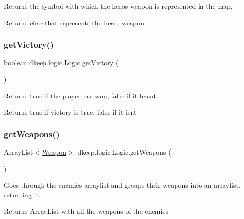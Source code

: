 Returns the symbol with which the hero\textquotesingle{}s weapon is represented in the map. \begin{DoxyReturn}{Returns}
char that represents the hero\textquotesingle{}s weapon 
\end{DoxyReturn}
\mbox{\label{classdkeep_1_1logic_1_1_logic_a8873eb8f5bcdd55d87fe1e9953da00e0}} 
\subsubsection{\texorpdfstring{get\+Victory()}{getVictory()}}
{\footnotesize\ttfamily boolean dkeep.\+logic.\+Logic.\+get\+Victory (\begin{DoxyParamCaption}{ }\end{DoxyParamCaption})}

Returns true if the player has won, false if it hasn\textquotesingle{}t. \begin{DoxyReturn}{Returns}
true if victory is true, false if it isn\textquotesingle{}t 
\end{DoxyReturn}
\mbox{\label{classdkeep_1_1logic_1_1_logic_af58982bc364016e2d0e03a36440a99b4}} 
\subsubsection{\texorpdfstring{get\+Weapons()}{getWeapons()}}
{\footnotesize\ttfamily Array\+List$<$\hyperlink{classdkeep_1_1logic_1_1_weapon}{Weapon}$>$ dkeep.\+logic.\+Logic.\+get\+Weapons (\begin{DoxyParamCaption}{ }\end{DoxyParamCaption})}

Goes through the enemies arraylist and groups their weapons into an arraylist, returning it. \begin{DoxyReturn}{Returns}
Array\+List with all the weapons of the enemies 
\end{DoxyReturn}
\mbox{\label{classdkeep_1_1logic_1_1_logic_a90069e7aa3f72919105ee446842e44fa}} 
